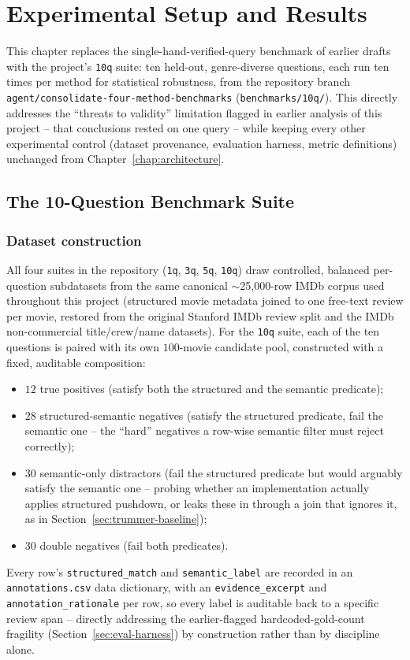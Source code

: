 \chapter{Experimental Setup and Results}
\label{chap:experiments}

This chapter replaces the single-hand-verified-query benchmark of
earlier drafts with the project's \texttt{10q} suite: ten held-out,
genre-diverse questions, each run ten times per method for statistical
robustness, from the repository branch
\texttt{agent/consolidate-four-method-benchmarks}
(\texttt{benchmarks/10q/}). This directly addresses the ``threats to
validity'' limitation flagged in earlier analysis of this project --
that conclusions rested on one query -- while keeping every other
experimental control (dataset provenance, evaluation harness, metric
definitions) unchanged from Chapter~\ref{chap:architecture}.

\section{The 10-Question Benchmark Suite}
\label{sec:10q-suite}

\subsection{Dataset construction}
All four suites in the repository (\texttt{1q}, \texttt{3q}, \texttt{5q},
\texttt{10q}) draw controlled, balanced per-question subdatasets from
the same canonical $\sim$25{,}000-row IMDb corpus used throughout this
project (structured movie metadata joined to one free-text review per
movie, restored from the original Stanford IMDb review split and the
IMDb non-commercial title/crew/name datasets). For the \texttt{10q}
suite, each of the ten questions is paired with its own $100$-movie
candidate pool, constructed with a fixed, auditable composition:
\begin{itemize}
  \item $12$ true positives (satisfy both the structured and the
        semantic predicate);
  \item $28$ structured-semantic negatives (satisfy the structured
        predicate, fail the semantic one -- the ``hard'' negatives a
        row-wise semantic filter must reject correctly);
  \item $30$ semantic-only distractors (fail the structured predicate
        but would arguably satisfy the semantic one -- probing whether
        an implementation actually applies structured pushdown, or
        leaks these in through a join that ignores it, as in
        Section~\ref{sec:trummer-baseline});
  \item $30$ double negatives (fail both predicates).
\end{itemize}
Every row's \texttt{structured\_match} and \texttt{semantic\_label} are
recorded in an \texttt{annotations.csv} data dictionary, with an
\texttt{evidence\_excerpt} and \texttt{annotation\_rationale} per row, so
every label is auditable back to a specific review span -- directly
addressing the earlier-flagged hardcoded-gold-count fragility
(Section~\ref{sec:eval-harness}) by construction rather than by
discipline alone.

